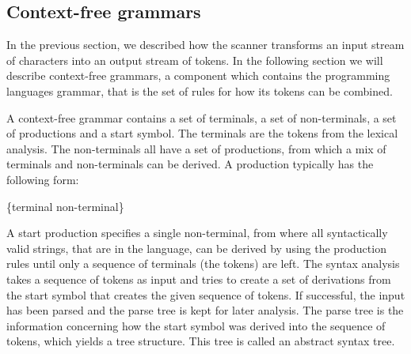 \subsection{Context-free grammars}
\label{sec:context-freegrammars}

In the previous section, we described how the scanner transforms an input stream
of characters into an output stream of tokens. In the following section we will
describe context-free grammars, a component which contains the programming
languages grammar, that is the set of rules for how its tokens can be combined.

A context-free grammar contains a set of terminals, a set of non-terminals, a
set of productions and a start symbol. The terminals are the tokens from the
lexical analysis. The non-terminals all have a set of productions, from which a
mix of terminals and non-terminals can be derived. A production typically
has the following form:

\begin{ebnf}
 {\{terminal \gor \gcat non-terminal\}}
\end{ebnf}

A start production specifies a single non-terminal, from where all syntactically
valid strings, that are in the language, can be derived by using the
production rules until only a sequence of terminals (the tokens) are left. The
syntax analysis takes a sequence of tokens as input and tries to create a set of
derivations from the start symbol that creates the given sequence of tokens. If
successful, the input has been parsed and the parse tree is kept for later
analysis. The parse tree is the information concerning how the start symbol was
derived into the sequence of tokens, which yields a tree structure. This tree
is called an abstract syntax tree.

